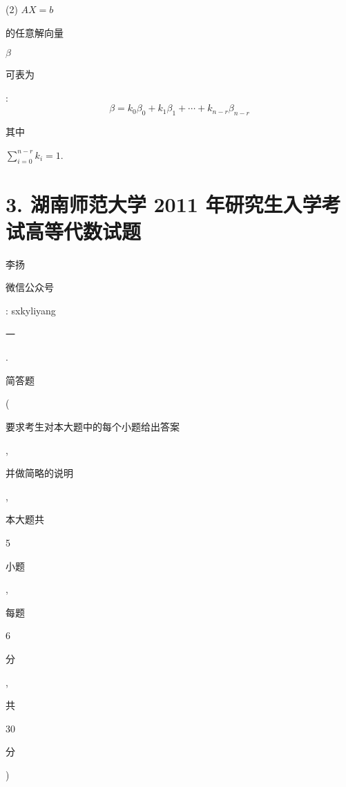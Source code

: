\documentclass[10pt]{article}
\begin{document}
(2) $A X=b$ \begin{CJK}{UTF8}{mj}的任意解向量\end{CJK} $\beta$ \begin{CJK}{UTF8}{mj}可表为\end{CJK}:
$$
\beta=k_{0} \beta_{0}+k_{1} \beta_{1}+\cdots+k_{n-r} \beta_{n-r}
$$
\begin{CJK}{UTF8}{mj}其中\end{CJK} $\sum_{i=0}^{n-r} k_{i}=1$.

\section{3. 湖南师范大学 2011 年研究生入学考试高等代数试题}
\begin{CJK}{UTF8}{mj}李扬\end{CJK}

\begin{CJK}{UTF8}{mj}微信公众号\end{CJK}: sxkyliyang

\begin{CJK}{UTF8}{mj}一\end{CJK}. \begin{CJK}{UTF8}{mj}简答题\end{CJK} (\begin{CJK}{UTF8}{mj}要求考生对本大题中的每个小题给出答案\end{CJK}, \begin{CJK}{UTF8}{mj}并做简略的说明\end{CJK}, \begin{CJK}{UTF8}{mj}本大题共\end{CJK} 5 \begin{CJK}{UTF8}{mj}小题\end{CJK}, \begin{CJK}{UTF8}{mj}每题\end{CJK} 6 \begin{CJK}{UTF8}{mj}分\end{CJK}, \begin{CJK}{UTF8}{mj}共\end{CJK} 30 \begin{CJK}{UTF8}{mj}分\end{CJK})
\end{document}
